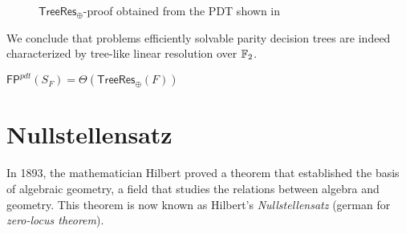 \begin{figure}[H]
    \centering
    

    \caption{$\mathsf{TreeRes}_\oplus$-proof obtained from the PDT shown in }
\end{figure}

We conclude that problems efficiently solvable parity decision trees are indeed characterized by tree-like linear resolution over $\mathbb{F}_2$.

\begin{theorem}
    $\mathsf{FP}^{pdt}(S_F) = \Theta(\mathsf{TreeRes}_\oplus(F))$
\end{theorem}

\section{Nullstellensatz}

In 1893, the mathematician Hilbert proved a theorem that established the basis of algebraic geometry, a field that studies the relations between algebra and geometry. This theorem is now known as Hilbert's \textit{Nullstellensatz} (german for \textit{zero-locus theorem}).

